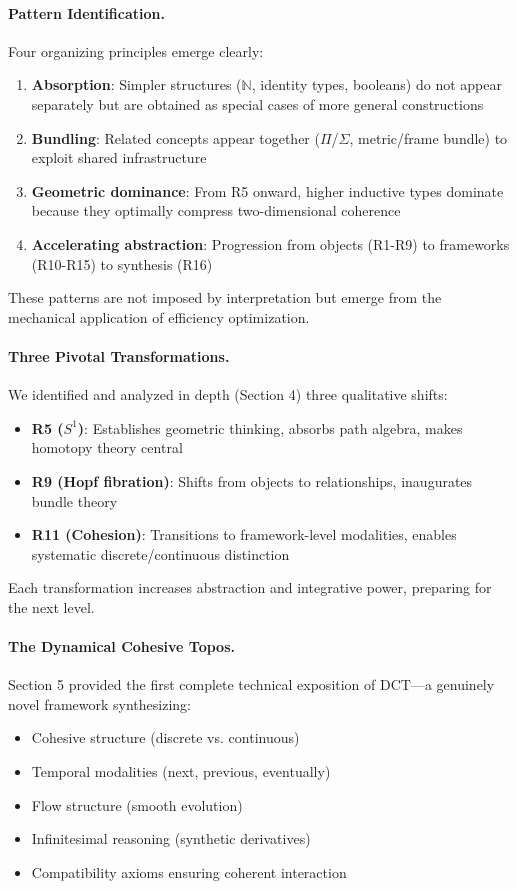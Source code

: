 \documentclass[11pt]{article}
\theoremstyle{definition}
\begin{document}
\paragraph{Pattern Identification.}
Four organizing principles emerge clearly:
\begin{enumerate}
\item \textbf{Absorption}: Simpler structures ($\mathbb{N}$, identity types, booleans) do not appear separately but are obtained as special cases of more general constructions
\item \textbf{Bundling}: Related concepts appear together ($\Pi$/$\Sigma$, metric/frame bundle) to exploit shared infrastructure
\item \textbf{Geometric dominance}: From R5 onward, higher inductive types dominate because they optimally compress two-dimensional coherence
\item \textbf{Accelerating abstraction}: Progression from objects (R1-R9) to frameworks (R10-R15) to synthesis (R16)
\end{enumerate}

These patterns are not imposed by interpretation but emerge from the mechanical application of efficiency optimization.

\paragraph{Three Pivotal Transformations.}
We identified and analyzed in depth (Section 4) three qualitative shifts:
\begin{itemize}
\item \textbf{R5 ($S^1$)}: Establishes geometric thinking, absorbs path algebra, makes homotopy theory central
\item \textbf{R9 (Hopf fibration)}: Shifts from objects to relationships, inaugurates bundle theory
\item \textbf{R11 (Cohesion)}: Transitions to framework-level modalities, enables systematic discrete/continuous distinction
\end{itemize}

Each transformation increases abstraction and integrative power, preparing for the next level.

\paragraph{The Dynamical Cohesive Topos.}
Section 5 provided the first complete technical exposition of DCT—a genuinely novel framework synthesizing:
\begin{itemize}
\item Cohesive structure (discrete vs. continuous)
\item Temporal modalities (next, previous, eventually)
\item Flow structure (smooth evolution)
\item Infinitesimal reasoning (synthetic derivatives)
\item Compatibility axioms ensuring coherent interaction
\end{itemize}
\end{document}
